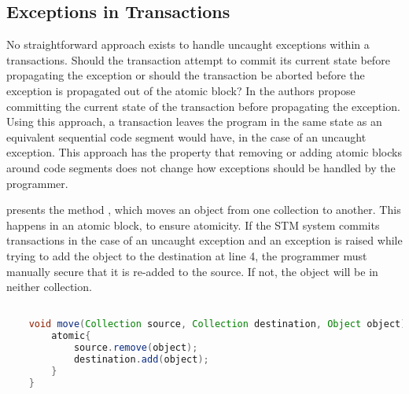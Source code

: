 \subsection{Exceptions in Transactions}
\label{subsec:stm:side_effects}
No straightforward approach exists to handle uncaught exceptions within a transactions\cite[p. 80]{harris2010transactional}. Should the transaction attempt to commit its current state before propagating the exception or should the transaction be aborted before the exception is propagated out of the atomic block? In \cite{harris2003language} the authors propose committing the current state of the transaction before propagating the exception. Using this approach, a transaction leaves the program in the same state as an equivalent sequential code segment would have, in the case of an uncaught exception. This approach has the property that removing or adding atomic blocks around code segments does not change how exceptions should be handled by the programmer\cite[p. 79]{harris2010transactional}.

 presents the method , which moves an object from one collection to another. This happens in an atomic block, to ensure atomicity. If the \ac{STM} system commits transactions in the case of an uncaught exception and an exception is raised while trying to add the object to the destination at line 4, the programmer must manually secure that it is re-added to the source. If not, the object will be in neither collection.

\begin{lstlisting}[label=lst:stm_exception,
  caption={Exceptions in Transaction},
  language=Java,  
  showspaces=false,
  showtabs=false,
  breaklines=true,
  showstringspaces=false,
  breakatwhitespace=true,
  commentstyle=\color{greencomments},
  keywordstyle=\color{bluekeywords},
  stringstyle=\color{redstrings},
  morekeywords={atomic, retry, orElse}]  % Start your code-block

	void move(Collection source, Collection destination, Object object){
		atomic{
			source.remove(object);
			destination.add(object);
		}
	}      
\end{lstlisting}

